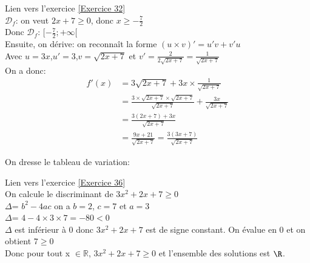\documentclass[12pt,fleqn]{report} %
\begin{document}
\begin{correction}Lien vers l'exercice   \ref{Exercice 32}\\
	$\mathcal{D}_f$: on veut $2x+7\geq0$, donc $x\geq-\frac{7}{2}$\\
	Donc $\mathcal{D}_f$: $[-\frac{7}{2};+\infty[$\\
	Ensuite, on dérive: on reconnaît la forme $(u\times v)' =u'v+v'u$ \\
	Avec $u= 3x$,\quad $u'=3$,\quad $v= \sqrt{2x+7}$ et $v'=\frac{2}{2\sqrt{2x+7}}= \frac{1}{\sqrt{2x+7}}$\\
	On a donc: \\
	\begin{align*}
	f'(x) & = 3\sqrt{2x+7}+ 3x\times  \frac{1}{\sqrt{2x+7}}\\
	& = \frac{3\times \sqrt{2x+7} \times \sqrt{2x+7}}{\sqrt{2x+7}}+ \frac{3x}{\sqrt{2x+7}}\\
	& = \frac{3(2x+7)+3x}{\sqrt{2x+7}}\\
	& = \frac{9x+21}{\sqrt{2x+7}} = \frac{3(3x+7)}{\sqrt{2x + 7}}
	\end{align*}
	
	
	On dresse le tableau de variation:\\
	\begin{center}
	\end{center}
\end{correction}

\begin{correction}Lien vers l'exercice   \ref{Exercice 36}\\
	On calcule le discriminant de $3x^2+2x+7\ge0$\\ [2mm]
	$\Delta$= $b^2-4ac$ on a $b=2$, $c=7$ et $a=3$\\[2mm]
	$\Delta$= $4-4\times 3\times 7= -80<0$\\[2mm]
	$\Delta$ est inférieur à 0 donc $3x^2+2x+7$ est de signe constant. On évalue en $0$ et on obtient $7\ge0$ \\ [2mm]
	Donc pour tout x $\in \mathbb{R}$,  $3x^2+2x+7\ge0$ et l'ensemble des solutions est $\R$.
\end{correction}
\end{document}
